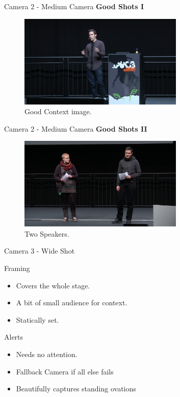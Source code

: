 \documentclass[aspectratio=169]{beamer}
\begin{document}
\begin{frame}{Camera 2 - Medium Camera}
	\textbf{Good Shots I}
	\begin{figure} 
		\centering
		\includegraphics[width=0.7\textwidth]{images/medium1.png}
		\caption{Good Context image.}
	\end{figure}
\end{frame}

\begin{frame}{Camera 2 - Medium Camera}
	\textbf{Good Shots II}
	\begin{figure} 
		\centering
		\includegraphics[width=0.7\textwidth]{images/Speaker_full.png}
		\caption{Two Speakers.}
	\end{figure}
\end{frame}

\begin{frame}{Camera 3 - Wide Shot}
		\begin{block}{Framing}
			\begin{itemize}
				\item Covers the whole stage.
				\item A bit of small audience for context.
				\item Statically set.
			\end{itemize}
		\end{block}

		\begin{alertblock}{Alerts}
			\begin{itemize}
				\item Needs no attention. 
				\item Fallback Camera if all else fails 
				\item Beautifully captures standing ovations
			\end{itemize}
		\end{alertblock}
\end{frame}
\end{document}
